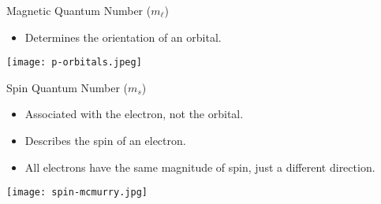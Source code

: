 \documentclass[handout,notes=hide]{beamer}
\begin{document}
\begin{frame}[s]{Magnetic Quantum Number ($m_\ell$)}
	\begin{itemize}
		\item Determines the \alert{orientation} of an orbital.
	\end{itemize}

	\vfill

	\texttt{[image: p-orbitals.jpeg]}

\end{frame}

\begin{frame}{Spin Quantum Number ($m_s$)}
	\begin{itemize}
		\item Associated with the electron, not the orbital.
		\item Describes the \alert{spin} of an electron.
		\item All electrons have the same \alert{magnitude} of spin, just
			a different \alert{direction}.
	\end{itemize}

	\begin{center}
		\texttt{[image: spin-mcmurry.jpg]}
	\end{center}
\end{frame}
\end{document}
